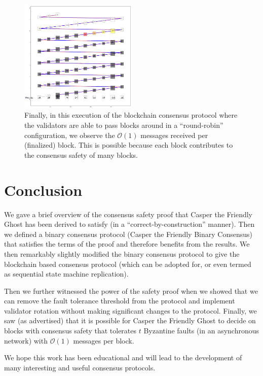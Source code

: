 \documentclass{article}
\theoremstyle{definition}
\begin{document}
\begin{figure}[h!]
\centering
\includegraphics[width=0.5\textwidth]{roundrobin}
\caption{Finally, in this execution of the blockchain consensus protocol where the validators are able to pass blocks around in a ``round-robin'' configuration, we observe the $\mathcal{O}(1)$ messages received per (finalized) block. This is possible because each block contributes to the consensus safety of many blocks.}
\end{figure}

\section{Conclusion}

We gave a brief overview of the consensus safety proof that Casper the Friendly Ghost has been derived to satisfy (in a ``correct-by-construction'' manner). Then we defined a binary consensus protocol (Casper the Friendly Binary Consensus) that satisfies the terms of the proof and therefore benefits from the results. We then remarkably slightly modified the binary consensus protocol to give the blockchain based consensus protocol (which can be adopted for, or even termed as sequential state machine replication).

Then we further witnessed the power of the safety proof when we showed that we can remove the fault tolerance threshold from the protocol and implement validator rotation without making significant changes to the protocol. Finally, we saw (as advertised) that it is possible for Casper the Friendly Ghost to decide on blocks with consensus safety that tolerates $t$ Byzantine faults (in an asynchronous network) with $\mathcal{O}(1)$ messages per block.

We hope this work has been educational and will lead to the development of many interesting and useful consensus protocols.
\end{document}
